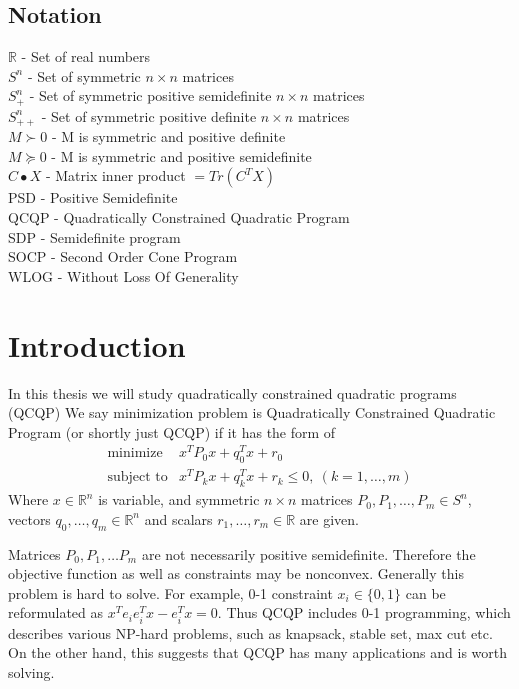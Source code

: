 \documentclass[10pt,oneside]{book}
\author{Matúš Stehlík}
\theoremstyle{definition}
\begin{document}
\section*{Notation}

$\mathbb{R}$ - Set of real numbers \\
$S^n$ - Set of symmetric $n\times n$ matrices \\
$S^n_+$ - Set of symmetric positive semidefinite $n\times n$ matrices \\
$S^n_{++}$ - Set of symmetric positive definite $n\times n$ matrices \\
$M\succ 0$ - M is symmetric and positive definite \\
$M\succeq 0$ - M is symmetric and positive semidefinite \\
$C\bullet X$ - Matrix inner product $=Tr(C^TX)$\\

PSD - Positive Semidefinite \\

QCQP - Quadratically Constrained Quadratic Program \\
SDP - Semidefinite program \\
SOCP - Second Order Cone Program \\

WLOG - Without Loss Of Generality

\chapter{Introduction}

In this thesis we will study quadratically constrained quadratic programs (QCQP)
\label{defQCQP}
We say minimization problem is Quadratically Constrained Quadratic Program (or shortly just QCQP) if it has the form of
\begin{equation}
\label{qcqp} 
\begin{array}{ll}
\mbox{minimize}& x^TP_0x + q_0^Tx +r_0 \\
\mbox{subject to}& x^TP_kx + q_k^Tx + r_k \leq 0, \  (k = 1,\dots ,m)
\end{array} 
\tag{QCQP}
\end{equation}
Where $x\in \mathbb{R}^n$ is variable, and symmetric $n\times n$ matrices $P_0, P_1, \dots ,P_m \in S^n$, vectors $q_0,\dots ,q_m \in \mathbb{R}^n$ and scalars $r_1,\dots ,r_m\in \mathbb{R}$ are given.

Matrices $P_0, P_1, \dots P_m$ are not necessarily positive semidefinite. Therefore the objective function as well as constraints may be nonconvex. Generally this problem is hard to solve. For example, 0-1 constraint $x_i\in \{0,1\}$ can be reformulated as $x^Te_ie_i^Tx - e_i^Tx =0$. Thus QCQP includes 0-1 programming, which describes various NP-hard problems, such as knapsack, stable set, max cut etc. On the other hand, this suggests that QCQP has many applications and is worth solving.
\end{document}
